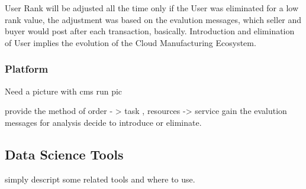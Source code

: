 User Rank will be adjusted all the time only if the User was eliminated for a low rank value, the adjustment was based on the evalution messages, which seller and buyer would post after each transaction, basically. Introduction and elimination of User implies the evolution of the Cloud Manufacturing Ecosystem. 

\subsubsection{Platform}
Need a picture with cms run pic

provide the method of order - > task , resources -> service
gain the evalution messages for analysis
decide to introduce or eliminate.

\subsection{Data Science Tools}


simply descript some related tools and where to use.
